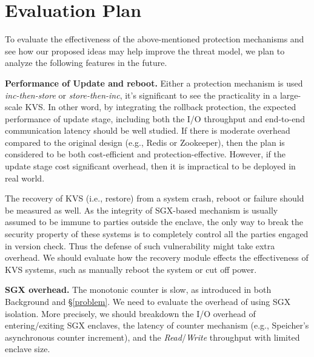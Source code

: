 \section{Evaluation Plan}
To evaluate the effectiveness of the above-mentioned protection mechanisms and see 
how our proposed ideas may help improve the threat model, we plan to analyze the following 
features in the future.

\noindent\textbf{Performance of Update and reboot. }
Either a protection mechanism is used \textit{inc-then-store} or \textit{store-then-inc}, 
it's significant to see the practicality in a large-scale KVS. In other word, by integrating 
the rollback protection, the expected performance of update stage, including both the I/O throughput and
end-to-end communication latency should be well studied. If there is moderate overhead compared 
to the original design (e.g., Redis or Zookeeper), then the plan is considered to be both 
cost-efficient and protection-effective. However, if the update stage cost significant
overhead, then it is impractical to be deployed in real world.

The recovery of KVS (i.e., restore) from a system crash, reboot or failure should be 
measured as well. As the integrity of SGX-based mechanism is usually assumed to be immune to 
parties outside the enclave, the only way to break the security property of these systems 
is to completely control all the parties engaged in version check. Thus the defense of such 
vulnerability might take extra overhead. We should evaluate how the recovery module effects 
the effectiveness of KVS systems, such as manually reboot the system or cut off power.

\noindent\textbf{SGX overhead. }
The monotonic counter is slow, as introduced in both Background and \S\ref{problem}.
We need to evaluate the overhead of using SGX isolation. More precisely, we should 
breakdown the I/O overhead of entering/exiting SGX enclaves, the latency of counter mechanism (e.g., Speicher's asynchronous 
counter increment), and the \textit{Read}/\textit{Write} throughput with limited enclave size.